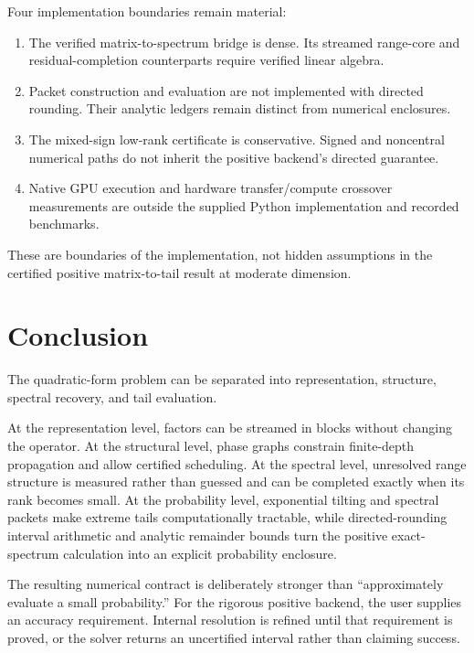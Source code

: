 Four implementation boundaries remain material:

\begin{enumerate}
\item The verified matrix-to-spectrum bridge is dense. Its streamed range-core
and residual-completion counterparts require verified linear algebra.
\item Packet construction and evaluation are not implemented with directed
rounding. Their analytic ledgers remain distinct from numerical enclosures.
\item The mixed-sign low-rank certificate is conservative. Signed and noncentral
numerical paths do not inherit the positive backend's directed guarantee.
\item Native GPU execution and hardware transfer/compute crossover measurements
are outside the supplied Python implementation and recorded benchmarks.
\end{enumerate}

These are boundaries of the implementation, not hidden assumptions in the
certified positive matrix-to-tail result at moderate dimension.



\section{Conclusion}\label{sec:final-32}

The quadratic-form problem can be separated into representation, structure,
spectral recovery, and tail evaluation.

At the representation level, factors can be streamed in blocks without
changing the operator.  At the structural level, phase graphs constrain
finite-depth propagation and allow certified scheduling.  At the spectral
level, unresolved range structure is measured rather than guessed and can be
completed exactly when its rank becomes small.  At the probability level,
exponential tilting and spectral packets make extreme tails computationally
tractable, while directed-rounding interval arithmetic and analytic remainder
bounds turn the positive exact-spectrum calculation into an explicit
probability enclosure.

The resulting numerical contract is deliberately stronger than
``approximately evaluate a small probability.''  For the rigorous positive
backend, the user supplies an accuracy requirement.  Internal resolution is
refined until that requirement is proved, or the solver returns an
uncertified interval rather than claiming success.

